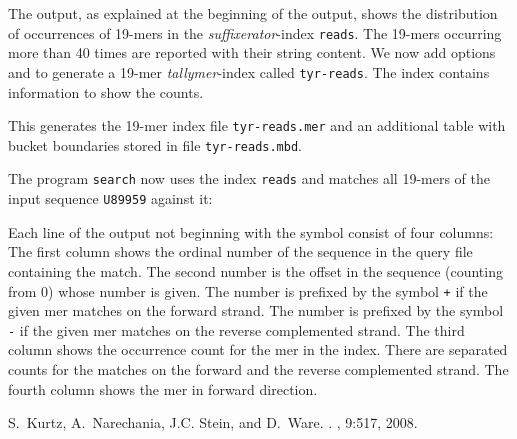 \documentclass[12pt]{article}
\newcommand{\Programname}[1]{\texttt{\small #1}}
\newcommand{\TYsearch}[0]{\Programname{search}\xspace}
\newcommand{\SFXidx}[0]{\textit{suffixerator}-index\xspace}
\newcommand{\Tyridx}[0]{\textit{tallymer}-index\xspace}
\begin{document}
The output, as explained at the beginning of the output, shows the
distribution of occurrences of 19-mers in the \SFXidx
\texttt{reads}. The 19-mers occurring more 
than 40 times are reported with their string content.
We now add options  and  to 
generate a 19-mer \Tyridx called \texttt{tyr-reads}. The index contains
information to show the counts.


This generates the 19-mer index file \texttt{tyr-reads.mer} and an additional
table with bucket boundaries stored in file \texttt{tyr-reads.mbd}.

The program \TYsearch now uses the index \texttt{reads} and
matches all 19-mers of the input sequence \texttt{U89959} against it:


Each line of the output not beginning with the symbol \texttt{}
consist of four columns: The first column shows the ordinal number of the
sequence in the query file containing the match. The second number
is the offset in the sequence (counting from 0) whose number is given.
The number is prefixed by the symbol \texttt{+} if the given mer
matches on the forward strand.
The number is prefixed by the symbol \texttt{-} if the given mer
matches on the reverse complemented strand. The third column shows
the occurrence count for the mer in the index. There are separated 
counts for the matches on the forward and the reverse complemented strand.
The fourth column shows the mer in forward direction. 
%
%
\begin{thebibliography}{1}
S.~Kurtz, A.~Narechania, J.C. Stein, and D.~Ware.
.
, 9:517, 2008.
\end{thebibliography}
\end{document}
